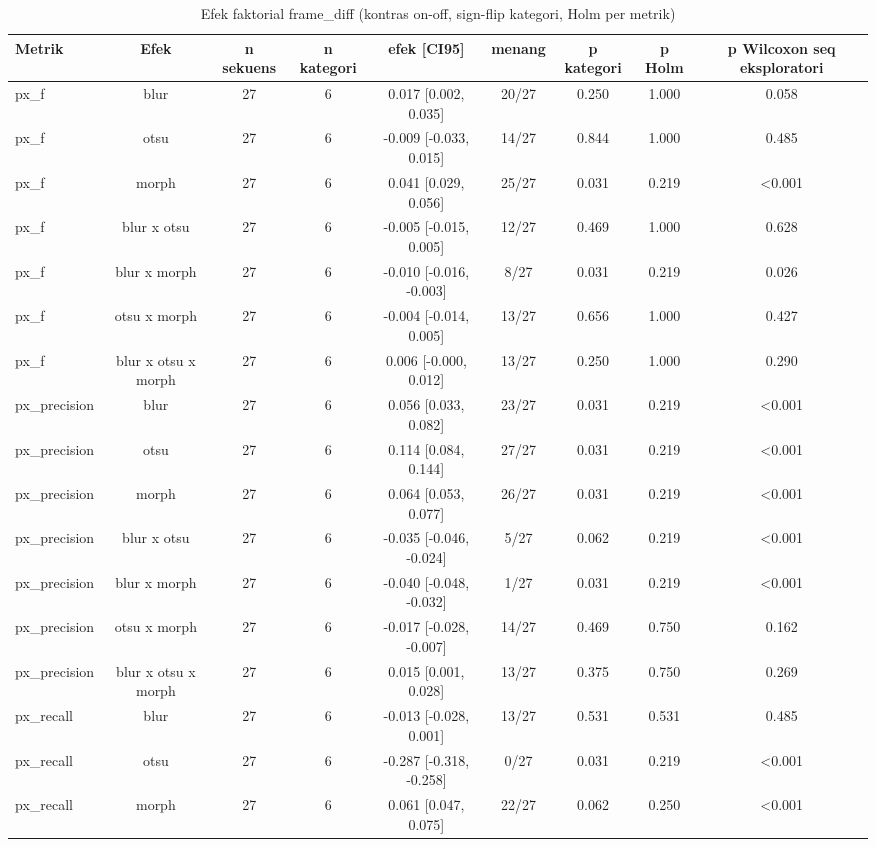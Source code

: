 \begin{table}[t]
\centering
\caption{Efek faktorial frame\_diff (kontras on-off, sign-flip kategori, Holm per metrik)}
\label{tab:stats_ablation_frame_diff}
\begin{tabular}{lcccccccc}
\toprule
Metrik & Efek & n sekuens & n kategori & efek [CI95] & menang & p kategori & p Holm & p Wilcoxon seq eksploratori \\
\midrule
px\_f & blur & 27 & 6 & 0.017 [0.002, 0.035] & 20/27 & 0.250 & 1.000 & 0.058 \\
px\_f & otsu & 27 & 6 & -0.009 [-0.033, 0.015] & 14/27 & 0.844 & 1.000 & 0.485 \\
px\_f & morph & 27 & 6 & 0.041 [0.029, 0.056] & 25/27 & 0.031 & 0.219 & <0.001 \\
px\_f & blur x otsu & 27 & 6 & -0.005 [-0.015, 0.005] & 12/27 & 0.469 & 1.000 & 0.628 \\
px\_f & blur x morph & 27 & 6 & -0.010 [-0.016, -0.003] & 8/27 & 0.031 & 0.219 & 0.026 \\
px\_f & otsu x morph & 27 & 6 & -0.004 [-0.014, 0.005] & 13/27 & 0.656 & 1.000 & 0.427 \\
px\_f & blur x otsu x morph & 27 & 6 & 0.006 [-0.000, 0.012] & 13/27 & 0.250 & 1.000 & 0.290 \\
px\_precision & blur & 27 & 6 & 0.056 [0.033, 0.082] & 23/27 & 0.031 & 0.219 & <0.001 \\
px\_precision & otsu & 27 & 6 & 0.114 [0.084, 0.144] & 27/27 & 0.031 & 0.219 & <0.001 \\
px\_precision & morph & 27 & 6 & 0.064 [0.053, 0.077] & 26/27 & 0.031 & 0.219 & <0.001 \\
px\_precision & blur x otsu & 27 & 6 & -0.035 [-0.046, -0.024] & 5/27 & 0.062 & 0.219 & <0.001 \\
px\_precision & blur x morph & 27 & 6 & -0.040 [-0.048, -0.032] & 1/27 & 0.031 & 0.219 & <0.001 \\
px\_precision & otsu x morph & 27 & 6 & -0.017 [-0.028, -0.007] & 14/27 & 0.469 & 0.750 & 0.162 \\
px\_precision & blur x otsu x morph & 27 & 6 & 0.015 [0.001, 0.028] & 13/27 & 0.375 & 0.750 & 0.269 \\
px\_recall & blur & 27 & 6 & -0.013 [-0.028, 0.001] & 13/27 & 0.531 & 0.531 & 0.485 \\
px\_recall & otsu & 27 & 6 & -0.287 [-0.318, -0.258] & 0/27 & 0.031 & 0.219 & <0.001 \\
px\_recall & morph & 27 & 6 & 0.061 [0.047, 0.075] & 22/27 & 0.062 & 0.250 & <0.001 \\

\end{tabular}
\end{table}
